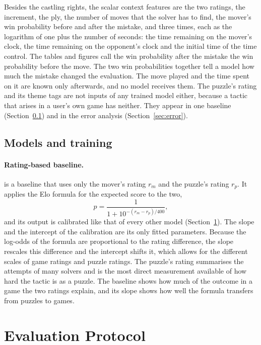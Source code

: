 \documentclass[11pt]{article}
\begin{document}
Besides the castling rights, the scalar context features are the two
ratings, the increment, the ply, the number of moves that the solver has to
find, the mover's win probability before and after the mistake, and three
times, each as the logarithm of one plus the number of seconds: the time
remaining on the mover's clock, the time remaining on the opponent's clock
and the initial time of the time control. The tables and figures call the
win probability after the mistake the win probability before the move. The
two win probabilities together tell a model how much the mistake changed the
evaluation. The move played and the time spent on it are known only
afterwards, and no model receives them. The puzzle's rating and its theme
tags are not inputs of any trained model either, because a tactic that arises
in a user's own game has neither. They appear in one baseline
(Section~\ref{sec:models}) and in the error analysis
(Section~\ref{sec:error}).

\subsection{Models and training}
\label{sec:models}



\paragraph{Rating-based baseline.}
 is a baseline that uses only the mover's rating $r_m$ and
the puzzle's rating $r_p$. It applies the Elo formula for the expected score
to the two,
\[
p = \frac{1}{1 + 10^{-(r_m - r_p)/400}},
\]
and its output is calibrated like that of every other model
(Section~\ref{sec:protocol}). The slope and the intercept of the calibration
are its only fitted parameters. Because the log-odds of the formula are
proportional to the rating difference, the slope rescales this difference and
the intercept shifts it, which allows for the different scales of game
ratings and puzzle ratings. The puzzle's rating summarises the attempts of
many solvers and is the most direct measurement available of how hard the
tactic is as a puzzle. The baseline shows how much of the outcome in a game
the two ratings explain, and its slope shows how well the formula transfers
from puzzles to games.

\section{Evaluation Protocol}
\label{sec:protocol}
\end{document}
